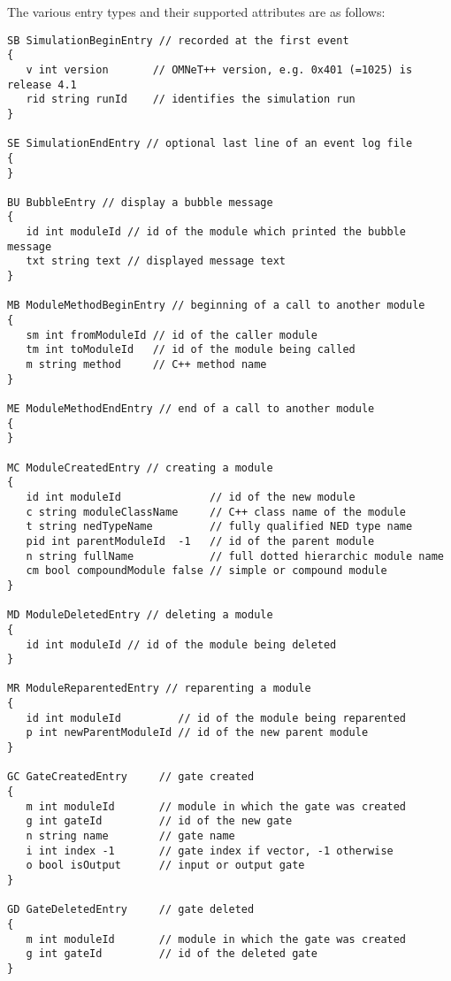 The various entry types and their supported attributes are as follows:


\begin{verbatim}
SB SimulationBeginEntry // recorded at the first event
{
   v int version       // OMNeT++ version, e.g. 0x401 (=1025) is release 4.1
   rid string runId    // identifies the simulation run
}

SE SimulationEndEntry // optional last line of an event log file
{
}

BU BubbleEntry // display a bubble message
{
   id int moduleId // id of the module which printed the bubble message
   txt string text // displayed message text
}

MB ModuleMethodBeginEntry // beginning of a call to another module
{
   sm int fromModuleId // id of the caller module
   tm int toModuleId   // id of the module being called
   m string method     // C++ method name
}

ME ModuleMethodEndEntry // end of a call to another module
{
}

MC ModuleCreatedEntry // creating a module
{
   id int moduleId              // id of the new module
   c string moduleClassName     // C++ class name of the module
   t string nedTypeName         // fully qualified NED type name
   pid int parentModuleId  -1   // id of the parent module
   n string fullName            // full dotted hierarchic module name
   cm bool compoundModule false // simple or compound module
}

MD ModuleDeletedEntry // deleting a module
{
   id int moduleId // id of the module being deleted
}

MR ModuleReparentedEntry // reparenting a module
{
   id int moduleId         // id of the module being reparented
   p int newParentModuleId // id of the new parent module
}

GC GateCreatedEntry     // gate created
{
   m int moduleId       // module in which the gate was created
   g int gateId         // id of the new gate
   n string name        // gate name
   i int index -1       // gate index if vector, -1 otherwise
   o bool isOutput      // input or output gate
}

GD GateDeletedEntry     // gate deleted
{
   m int moduleId       // module in which the gate was created
   g int gateId         // id of the deleted gate
}


\end{verbatim}
